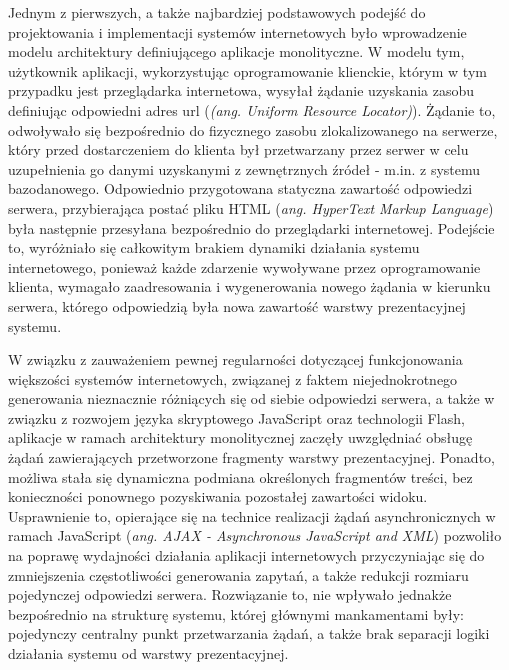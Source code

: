 Jednym z pierwszych, a także najbardziej podstawowych podejść do projektowania i implementacji systemów internetowych było wprowadzenie modelu architektury definiującego aplikacje monolityczne. W modelu tym, użytkownik aplikacji, wykorzystując oprogramowanie klienckie, którym w tym przypadku jest przeglądarka internetowa, wysyłał żądanie uzyskania zasobu definiując odpowiedni adres url (\textit{(ang. Uniform Resource Locator)}). Żądanie to, odwoływało się bezpośrednio do fizycznego zasobu zlokalizowanego na serwerze, który przed dostarczeniem do klienta był przetwarzany przez serwer w celu uzupełnienia go danymi uzyskanymi z zewnętrznych źródeł - m.in. z systemu bazodanowego. Odpowiednio przygotowana statyczna zawartość odpowiedzi serwera, przybierająca postać pliku HTML (\textit{ang. HyperText Markup Language}) była następnie przesyłana bezpośrednio do przeglądarki internetowej. Podejście to, wyróżniało się całkowitym brakiem dynamiki działania systemu internetowego, ponieważ każde zdarzenie wywoływane przez oprogramowanie klienta, wymagało zaadresowania i wygenerowania nowego żądania w kierunku serwera, którego odpowiedzią była nowa zawartość warstwy prezentacyjnej systemu.

W związku z zauważeniem pewnej regularności dotyczącej funkcjonowania większości systemów internetowych, związanej z faktem niejednokrotnego generowania nieznacznie różniących się od siebie odpowiedzi serwera, a także w związku z rozwojem języka skryptowego JavaScript oraz technologii Flash, aplikacje w ramach architektury monolitycznej zaczęły uwzględniać obsługę żądań zawierających przetworzone fragmenty warstwy prezentacyjnej. Ponadto, możliwa stała się dynamiczna podmiana określonych fragmentów treści, bez konieczności ponownego pozyskiwania pozostałej zawartości widoku. Usprawnienie to, opierające się na technice realizacji żądań asynchronicznych w ramach JavaScript (\textit{ang. AJAX - Asynchronous JavaScript and XML}) pozwoliło na poprawę wydajności działania aplikacji internetowych przyczyniając się do zmniejszenia częstotliwości generowania zapytań, a także redukcji rozmiaru pojedynczej odpowiedzi serwera. Rozwiązanie to, nie wpływało jednakże bezpośrednio na strukturę systemu, której głównymi mankamentami były: pojedynczy centralny punkt przetwarzania żądań, a także brak separacji logiki działania systemu od warstwy prezentacyjnej.

